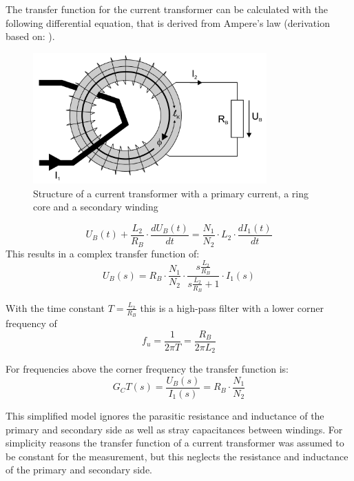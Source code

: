 The transfer function for the current transformer can be calculated with the following differential equation, that is derived from Ampere's law (derivation based on: \cite{highdynamiccurrent}).\\
\begin{figure}
	\includegraphics[width=0.8\textwidth]{figures/Theory/ct_setup}
	\caption[Kurze Abbildungsbeschreibung]{Structure of a current transformer with a primary current, a ring core and a secondary winding \protect\footnotemark}
	\label{fig.ct_setup}
\end{figure}

\begin{equation}
U_B(t) + \frac{L_2}{R_B} \cdot \frac{dU_B(t)}{dt}=\frac{N_1}{N_2} \cdot L_2 \cdot \frac{dI_1(t)}{dt}
\end{equation}
This results in a complex transfer function of: 
\begin{equation}
U_B(s) = R_B \cdot \frac{N_1}{N_2} \cdot \frac{s \frac{L_2}{R_B}}{s \frac{L_2}{R_B} +1} \cdot I_1(s)
\end{equation}

With the time constant $T=\frac{L_2}{R_B}$ this is a high-pass filter with a lower corner frequency of 
\begin{equation}
f_u= \frac{1}{2 \pi T} = \frac{R_B}{2 \pi L_2}
\end{equation}

For frequencies above the corner frequency the transfer function is:
\begin{equation}
G_CT(s) = \frac{U_B(s)}{I_1(s)}=R_B \cdot \frac{N_1}{N_2}
\end{equation}

This simplified model ignores the parasitic resistance and inductance of the primary and secondary side as well as stray capacitances between windings. 
For simplicity reasons the transfer function of a current transformer was assumed to be constant for the measurement, but this neglects the resistance and inductance of the primary and secondary side. 

